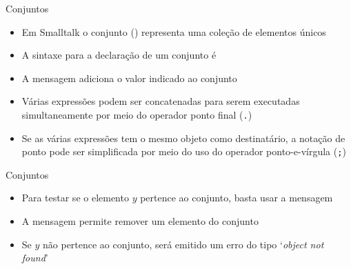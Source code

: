 \begin{frame}[fragile]{Conjuntos}

    \begin{itemize}
        \item Em Smalltalk o conjunto () representa uma coleção de elementos
            únicos

        \item A sintaxe para a declaração de um conjunto é


        \item A mensagem  adiciona o valor indicado ao conjunto

        \item Várias expressões podem ser concatenadas para serem executadas simultaneamente
            por meio do operador ponto final (\texttt{.})


        \item Se as várias expressões tem o mesmo objeto como destinatário, a notação
            de ponto pode ser simplificada por meio do uso do operador ponto-e-vírgula
            (\texttt{;})

    \end{itemize}

\end{frame}

\begin{frame}[fragile]{Conjuntos}

    \begin{itemize}

        \item Para testar se o elemento $y$ pertence ao conjunto, basta usar a mensagem


        \item A mensagem  permite remover um elemento do
            conjunto


        \item Se $y$ não pertence ao conjunto, será emitido um erro do tipo `\textit{object
            not found}'
    \end{itemize}

\end{frame}


